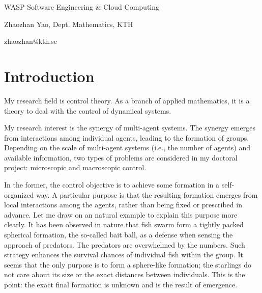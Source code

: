 \documentclass[11pt]{article}
\begin{document}
\begin{center}
    {\Large WASP Software Engineering \& Cloud Computing}\par
    {Zhaozhan Yao, Dept. Mathematics, KTH}\par
    {\small zhaozhan@kth.se}
\end{center}

\section{Introduction}
My research field is control theory. As a branch of applied mathematics, it is a theory to deal with the control of dynamical systems. 

My research interest is the synergy of multi-agent systems. The synergy emerges from interactions among individual agents, leading to the formation of groups. Depending on the scale of multi-agent systems (i.e., the number of agents) and available information, two types of problems are considered in my doctoral project: microscopic and macroscopic control. 

In the former, the control objective is to achieve some formation in a self-organized way. A particular purpose is that the resulting formation emerges from local interactions among the agents, rather than being fixed or prescribed in advance. Let me draw on an natural example to explain this purpose more clearly. It has been observed in nature that fish swarm form  a tightly packed spherical formation, the so-called bait ball, as a defense when sensing the approach of predators. The predators are overwhelmed by the numbers. Such strategy enhances the survival chances of individual fish within the group. It seems that the only purpose is to form a sphere-like formation; the starlings do not care about its size or the exact distances between individuals. This is the point: the exact final formation is unknown and is the result of emergence. 
\end{document}
